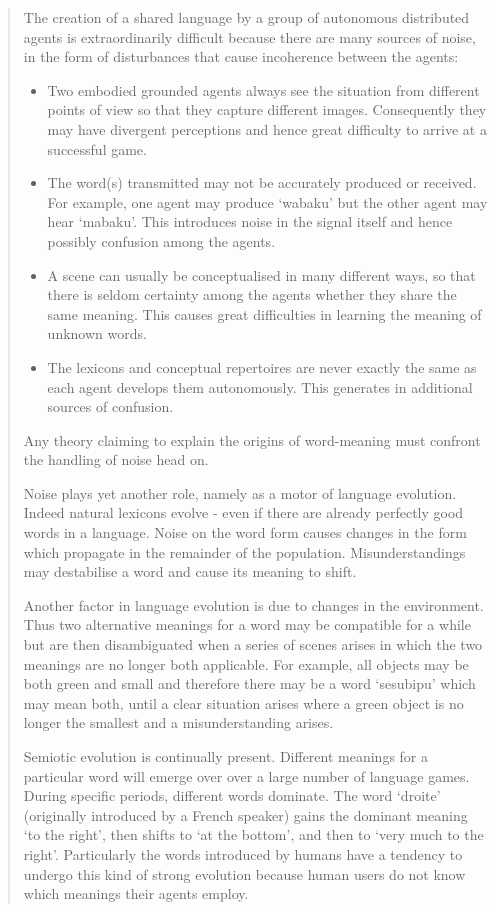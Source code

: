 \begin{quotation}
\enlargethispage{1em}
The creation of a shared language by a group of autonomous distributed agents is extraordinarily difficult because there are many sources of noise, in the form of disturbances that cause incoherence between the agents:

\begin{itemize} 
\item Two embodied grounded agents always see the situation from different points of view so that they capture different images. Consequently they may have divergent perceptions and hence great difficulty to arrive at a successful game. 
\item The word(s) transmitted may not be accurately produced or received. For example, one agent may produce `wabaku' but the other agent may hear `mabaku'. This introduces noise in the signal itself and hence possibly confusion among the agents. 
\item A scene can usually be conceptualised in many different ways, so that there is seldom certainty among the agents whether they share the same meaning. This causes great difficulties in learning the meaning of unknown words. 
\item The lexicons and conceptual repertoires are never exactly the same as each agent develops them autonomously. This generates in additional sources of confusion.
\end{itemize} 

Any theory claiming to explain the origins of word-meaning must confront the handling of noise head on.

Noise plays yet another role, namely as a motor of language evolution. Indeed natural lexicons evolve - even if there are already perfectly good words in a language. Noise on the word form causes changes in the form which propagate in the remainder of the population. Misunderstandings may destabilise a word and cause its meaning to shift.

Another factor in language evolution is due to changes in the environment. Thus two alternative meanings for a word may be compatible for a while but are then disambiguated when a series of scenes arises in which the two meanings are no longer both applicable. For example, all objects may be both green and small and therefore there may be a word `sesubipu' which may mean both, until a clear situation arises where a green object is no longer the smallest and a misunderstanding arises.

Semiotic evolution is continually present. Different meanings for a particular word will emerge over over a large number of language games. During specific periods, different words dominate. The word `droite' (originally introduced by a French speaker) gains the dominant meaning `to the right', then shifts to `at the bottom', and then to `very much to the right'. Particularly the words introduced by humans have a tendency to undergo this kind of strong evolution because human users do not know which meanings their agents employ.


\end{quotation}
